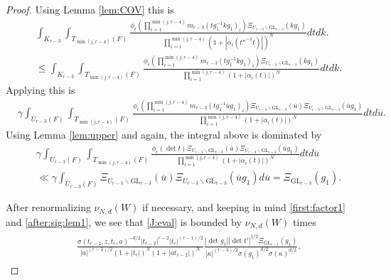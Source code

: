 \documentclass[12pt]{amsart}
\theoremstyle{remark}
\numberwithin{equation}{section}
\newcommand{\GL}{\mathrm{GL}}
\theoremstyle{definition}
\numberwithin{equation}{subsection}
\begin{document}
\begin{proof}
Using Lemma \ref{lem:COV} this is 
\begin{align*}
&\int_{K_{r-3}}\int_{T_{\min(j,r-4)}(F)}\frac{\phi_\epsilon(\prod_{i=1}^{\min(j,r-4)}m_{r-3}(tg_1^{-1}kg_1)_i)\Xi_{U_{r-3} \backslash \GL_{r-3}}(kg_1)}{
   \prod_{i=1}^{\min(j,r-4)}\left(1+\left|\alpha_i\left(t''^{-1}t\right)\right|\right)^{N}} dtdk.\\
   &\le \int_{K_{r-3}}\int_{T_{\min(j,r-4)}(F)}\frac{\phi_\epsilon(\prod_{i=1}^{\min(j,r-4)}m_{r-3}(tg_1^{-1}kg_1)_i)\Xi_{U_{r-3} \backslash \GL_{r-3}}(kg_1)}{
   \prod_{i=1}^{\min(j,r-4)}\left(1+\left|\alpha_i(t)\right|\right)^{N}} dtdk.
\end{align*}
Applying  this is
\begin{align*}
&\gamma \int_{\overline{U}_{r-3}(F)}\int_{T_{\min(j,r-4)}(F)}\frac{\phi_{\epsilon}(\prod_{i=1}^{\min(j,r-4)}m_{r-3}(tg_1^{-1}\overline{u}g_1)_i)\Xi_{U_{r-3} \backslash \GL_{r-3}}(\overline{u})\Xi_{U_{r-3} \backslash \GL_{r-3}}(\overline{u}g_1)}{\prod_{i=1}^{\min(j,r-4)}\left(1+\left|\alpha_i(t)\right|\right)^{N}} dtd\overline{u}.
\end{align*}
Using Lemma \ref{lem:upper} and   again, the integral above is dominated by 
\begin{align*}
&\gamma \int_{\overline{U}_{r-3}(F)}\int_{T_{\min(j,r-4)}(F)}\frac{\phi_\epsilon(\det t)\Xi_{U_{r-3} \backslash \GL_{r-3}}(\overline{u})\Xi_{U_{r-3} \backslash \GL_{r-3}}(\overline{u}g_1)}{
 \prod_{i=1}^{\min(j,r-4)}\left(1+\left|\alpha_i(t)\right|\right)^{N}} dtd\overline{u}\\
   &\ll \gamma \int_{\overline{U}_{r-3}(F)}\Xi_{U_{r-3} \backslash \GL_{r-3}}(\overline{u})\Xi_{U_{r-3} \backslash \GL_{r-3}}(\overline{u}g_1)d\overline{u}=\Xi_{\GL_{r-3}}(g_1).
\end{align*}

After renormalizing $\nu_{N,d}(W)$ if necessary, and keeping in mind  \eqref{first:factor1} and \eqref{after:sig:lem1}, we see that \eqref{J:eval} is bounded by $\nu_{N,d}(W)$ times
\begin{align} \label{J:eval2}
\begin{split}
&\frac{\sigma(t_{r-2},z,t_r,a)^{-d/2}|t_{r-2}|^{r-2}|t_r|^{(r-1)/2}}{|a|^{(r-2)/2}(1+|t_r|)^{N}(1+|at_{r-2}|)^N}
 \frac{|\det g_1||\det t'|^{1/2}\Xi_{\GL_{r-3}}(g_1)}{|\kappa|^{(r-3)/2}\sigma(g_1)^{d/2}\sigma(\kappa)^{d/2}}.
\end{split}
\end{align}



\end{proof}
\end{document}
